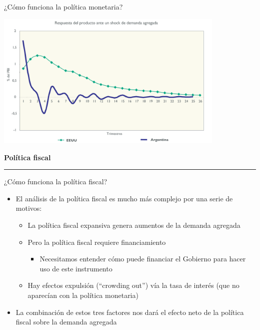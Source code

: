 \documentclass{beamer}
\begin{document}

\begin{frame}{¿Cómo funciona la política monetaria?}
    
    \centering\includegraphics[width=11cm]{P81.png}\

\end{frame}

\begin{frame}{}
\centering 	\huge \textbf{Política fiscal} 
\vspace{2mm}
\hrule
\end{frame}


\begin{frame}{¿Cómo funciona la política fiscal?}
    \begin{itemize}
        \item El análisis de la política fiscal es mucho más complejo por una serie de motivos:
        \begin{itemize}
            \item La política fiscal expansiva genera aumentos de la demanda agregada 
            \item Pero la política fiscal requiere financiamiento
            \begin{itemize}
                \item Necesitamos entender cómo puede financiar el Gobierno para hacer uso de este instrumento
            \end{itemize}
            \item Hay efectos expulsión (“crowding out”) vía la tasa de interés (que no aparecían con la política monetaria)
        \end{itemize}
        \vspace{2mm}
        \item La combinación de estos tres factores nos dará el efecto neto de la política fiscal sobre la demanda agregada
    \end{itemize}
\end{frame}
\end{document}
